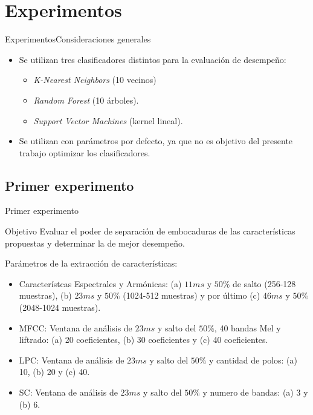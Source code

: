 \documentclass[aspectratio=169]{beamer}
\begin{document}
\section{Experimentos}

\begin{frame}{Experimentos}{Consideraciones generales}
  \begin{itemize}
  \item {
    Se utilizan tres clasificadores distintos para la evaluación de desempeño:
    \begin{itemize}
    	\item \textit{K-Nearest Neighbors} (10 vecinos)
     	\item \textit{Random Forest} (10 árboles).
     	\item \textit{Support Vector Machines} (kernel lineal).
    \end{itemize}}
  \item {   
    Se utilizan con parámetros por defecto, ya que no es objetivo del presente trabajo optimizar los clasificadores.
  }

  \end{itemize}
\end{frame}

\subsection{Primer experimento}

\begin{frame}{Primer experimento}
\begin{block}{Objetivo}
Evaluar el poder de separación de embocaduras de las características propuestas y determinar la de mejor desempeño.
\end{block}
\begin{block}{Parámetros de la extracción de características:}
\begin{itemize}
	\item Característcas Espectrales y Armónicas: (a) $11ms$ y $50\%$ de salto (256-128 muestras), (b) $23ms$ y $50\%$  (1024-512 muestras) y por último (c) $46ms$ y $50\%$  (2048-1024 muestras).
	\item MFCC: Ventana de análisis de $23ms$ y salto del $50\%$, 40 bandas Mel y liftrado: (a) 20 coeficientes, (b) 30 coeficientes y (c) 40 coeficientes.
	\item LPC: Ventana de análisis de $23ms$ y salto del $50\%$ y cantidad de polos: (a) 10, (b) 20 y (c) 40.
	\item SC: Ventana de análisis de $23ms$ y salto del $50\%$ y numero de bandas: (a) 3 y (b) 6.
\end{itemize}
\end{block}
\end{frame}
\end{document}
